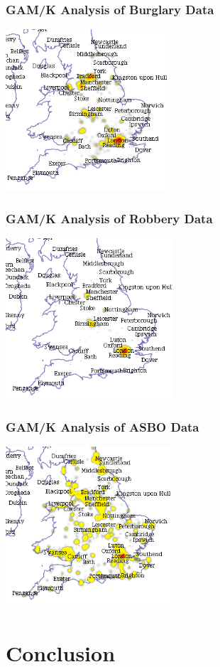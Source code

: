 \documentclass{beamer}
\begin{document}
\begin{frame}[t]
\frametitle{GAM/K Analysis of Burglary Data}
\includegraphics[height=6.0cm]{gam_burglary.png}
\end{frame}

\begin{frame}[t]
\frametitle{GAM/K Analysis of Robbery Data}
\includegraphics[height=6.0cm]{gam_robbery.png}
\end{frame}

\begin{frame}[t]
\frametitle{GAM/K Analysis of ASBO Data}
\includegraphics[height=6.0cm]{gam_asbo.png}
\end{frame}


\section{Conclusion}
\end{document}
